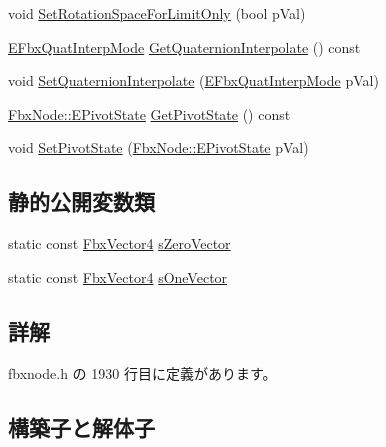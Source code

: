 \begin{DoxyCompactItemize}
\item 
void \hyperlink{class_fbx_node_1_1_pivot_a49a017748913e12ecd0079052ed2fda4}{Set\+Rotation\+Space\+For\+Limit\+Only} (bool p\+Val)
\item 
\hyperlink{fbxmath_8h_a9c7a0dfb52c83256d4a92c5c6d1be72a}{E\+Fbx\+Quat\+Interp\+Mode} \hyperlink{class_fbx_node_1_1_pivot_a2ff9c11d0b9b8c270eb9ba1f39dcc4b3}{Get\+Quaternion\+Interpolate} () const
\item 
void \hyperlink{class_fbx_node_1_1_pivot_a6256262e2d4d5e851d68262f0c5b71bd}{Set\+Quaternion\+Interpolate} (\hyperlink{fbxmath_8h_a9c7a0dfb52c83256d4a92c5c6d1be72a}{E\+Fbx\+Quat\+Interp\+Mode} p\+Val)
\item 
\hyperlink{class_fbx_node_a153fc75958227fc6728a2233b630b58a}{Fbx\+Node\+::\+E\+Pivot\+State} \hyperlink{class_fbx_node_1_1_pivot_a8ca16147fd0a4e3f96727cbb50abb144}{Get\+Pivot\+State} () const
\item 
void \hyperlink{class_fbx_node_1_1_pivot_ab16f55dcd7b0058afb65395b003b5da4}{Set\+Pivot\+State} (\hyperlink{class_fbx_node_a153fc75958227fc6728a2233b630b58a}{Fbx\+Node\+::\+E\+Pivot\+State} p\+Val)
\end{DoxyCompactItemize}
\subsection*{静的公開変数類}
\begin{DoxyCompactItemize}
\item 
static const \hyperlink{class_fbx_vector4}{Fbx\+Vector4} \hyperlink{class_fbx_node_1_1_pivot_a5bcef181b0b941f66222adb91896ff2c}{s\+Zero\+Vector}
\item 
static const \hyperlink{class_fbx_vector4}{Fbx\+Vector4} \hyperlink{class_fbx_node_1_1_pivot_a885264a556ea04dc8baf96a0ef2067b1}{s\+One\+Vector}
\end{DoxyCompactItemize}


\subsection{詳解}


 fbxnode.\+h の 1930 行目に定義があります。



\subsection{構築子と解体子}
\mbox{\label{class_fbx_node_1_1_pivot_a1c6a597612cd876db8a767826aa06f44}} 
